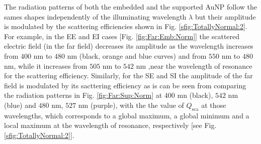 The radiation patterns of both the embedded  and the supported AuNP follow the sames shapes independently of the illuminating wavelength $\lambda$ but their amplitude is modulated by the scattering efficiencies shown in Fig. \ref{sfig:TotallyNormal:2}. For example, in the EE  and EI cases [Fig. \ref{fig:Far:Emb:Norm}] the scattered electric field (in the far field) decreases its amplitude as the wavelength increases from $400$ nm to $480$ nm (black, orange and blue curves) and from   $550$ nm to $480$  nm, while it increases from $505$ nm to $542$ nm ,near the wavelength of resonance for the scattering efficiency. Similarly, for the SE and SI  the amplitude of the far field is modulated by its sacttering efficiency as is can be seen from comparing the radiation patterns in Fig. \ref{fig:Far:Sup:Norm} at $400$ mn (black), $542$ nm (blue) and $480$ nm, $527$ nm (purple), with the the value of $Q_\text{sca}$ at those wavelengths, which corresponds to a global maximum, a global minimum and a local maximum at the wavelength of resonance, respectively [see Fig. \ref{sfig:TotallyNormal:2}].

